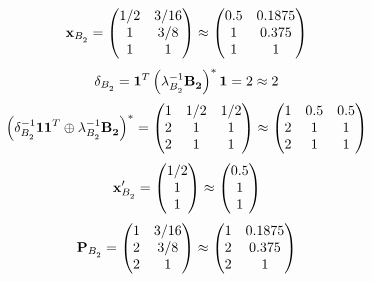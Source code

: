 \documentclass[10pt,a4paper]{article}
\begin{document}
	\[
		\bold{x}_{B_2^{}} = 
		\begin{pmatrix}
			{1} / {{2}} & {{3}} / {{16}} \\
			{1}{} & {{3}} / {{8}} \\
			{1}{} & {1}{} \\
		\end{pmatrix}
		\approx
		\begin{pmatrix}
			0.5      & 0.1875   \\
			1        & 0.375    \\
			1        & 1        \\
		\end{pmatrix}
	\]
	\[
		\delta_{B_2^{}} = \bold{1}^T \left(\lambda_{B_2^{}}^{-1}\bold{B_2^{}}\right)^* \bold{1} = {{2}}{}\approx 2
	\]
	\[
		\left(\delta_{B_2^{}}^{-1}\bold{11}^T \oplus \lambda_{B_2^{}}^{-1}\bold{B_2^{}}\right)^* = 
		\begin{pmatrix}
			{1}{} & {1} / {{2}} & {1} / {{2}} \\
			{{2}}{} & {1}{} & {1}{} \\
			{{2}}{} & {1}{} & {1}{} \\
		\end{pmatrix}
		\approx
		\begin{pmatrix}
			1        & 0.5      & 0.5      \\
			2        & 1        & 1        \\
			2        & 1        & 1        \\
		\end{pmatrix}
	\]
	\[
		\bold{x}'_{B_2^{}} = 
		\begin{pmatrix}
			{1} / {{2}} \\
			{1}{} \\
			{1}{} \\
		\end{pmatrix}
		\approx
		\begin{pmatrix}
			0.5      \\
			1        \\
			1        \\
		\end{pmatrix}
	\]
	\[
		\bold{P}_{B_2^{}} = 
		\begin{pmatrix}
			{1}{} & {{3}} / {{16}} \\
			{{2}}{} & {{3}} / {{8}} \\
			{{2}}{} & {1}{} \\
		\end{pmatrix}
		\approx
		\begin{pmatrix}
			1        & 0.1875   \\
			2        & 0.375    \\
			2        & 1        \\
		\end{pmatrix}
	\]
\end{document}
